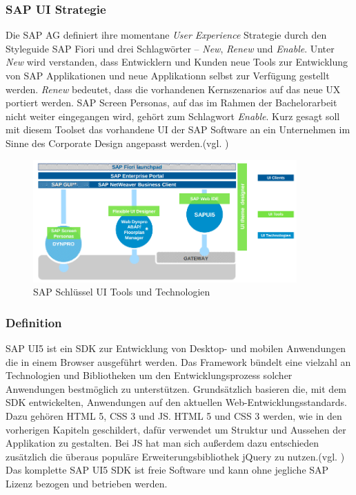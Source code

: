 \subsubsection{SAP UI Strategie}
Die SAP AG definiert ihre momentane \textit{User Experience} Strategie durch den Styleguide SAP Fiori und drei Schlagwörter -- \textit{New}, \textit{Renew} und \textit{Enable}. Unter \textit{New} wird verstanden, dass Entwicklern und Kunden neue Tools zur Entwicklung von SAP Applikationen und neue Applikationn selbst zur Verfügung gestellt werden. \textit{Renew} bedeutet, dass die vorhandenen Kernszenarios auf das neue UX portiert werden. SAP Screen Personas, auf das im Rahmen der Bachelorarbeit nicht weiter eingegangen wird, gehört zum Schlagwort \textit{Enable}. Kurz gesagt soll mit diesem Toolset das vorhandene UI der SAP Software an ein Unternehmen im Sinne des Corporate Design angepasst werden.(vgl. \cite{SAPUX})

\begin{figure}[htb]
  \centering
  \includegraphics[width=0.9\textwidth]{abb/sap_key_ui_tools}
  \caption[SAP Schlüssel UI Tools und Technologien]{SAP Schlüssel UI Tools und Technologien\footnotemark}
  \label{fig:sapkeyuitools}
\end{figure}

\subsubsection{Definition}
SAP UI5 ist ein SDK zur Entwicklung von Desktop- und mobilen Anwendungen die in einem Browser ausgeführt werden. Das Framework bündelt eine vielzahl an Technologien und Bibliotheken um den Entwicklungsprozess solcher Anwendungen bestmöglich zu unterstützen. Grundsätzlich basieren die, mit dem SDK entwickelten, Anwendungen auf den aktuellen Web-Entwicklungsstandards. Dazu gehören HTML 5, CSS 3 und JS. HTML 5 und CSS 3 werden, wie in den vorherigen Kapiteln geschildert, dafür verwendet um Struktur und Aussehen der Applikation zu gestalten. Bei JS hat man sich außerdem dazu entschieden zusätzlich die überaus populäre Erweiterungsbibliothek jQuery zu nutzen.(vgl. \cite{BuiltWith2014}) Das komplette SAP UI5 SDK ist freie Software und kann ohne jegliche SAP Lizenz bezogen und betrieben werden.

